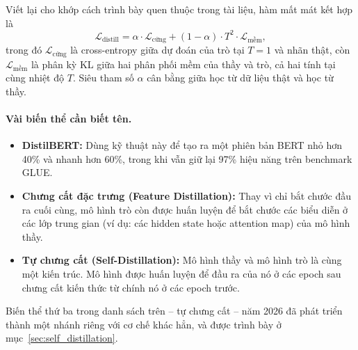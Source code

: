 Viết lại cho khớp cách trình bày quen thuộc trong tài liệu, hàm mất mát kết hợp là
\begin{equation}
	\mathcal{L}_{\text{distill}} = \alpha \cdot \mathcal{L}_{\text{cứng}} + (1-\alpha) \cdot T^2 \cdot \mathcal{L}_{\text{mềm}},
	\label{eq:distillation_loss}
\end{equation}
trong đó $\mathcal{L}_{\text{cứng}}$ là cross-entropy giữa dự đoán của trò tại $T = 1$ và nhãn thật, còn $\mathcal{L}_{\text{mềm}}$ là phân kỳ KL giữa hai phân phối mềm của thầy và trò, cả hai tính tại cùng nhiệt độ $T$. Siêu tham số $\alpha$ cân bằng giữa học từ dữ liệu thật và học từ thầy.

\begin{center}
	\label{fig:knowledge_distillation}
\end{center}

\paragraph{Vài biến thể cần biết tên.}
\begin{itemize}
	\item \textbf{DistilBERT:} Dùng kỹ thuật này để tạo ra một phiên bản BERT nhỏ hơn 40\% và nhanh hơn 60\%, trong khi vẫn giữ lại 97\% hiệu năng trên benchmark GLUE.
	\item \textbf{Chưng cất đặc trưng (Feature Distillation):} Thay vì chỉ bắt chước đầu ra cuối cùng, mô hình trò còn được huấn luyện để bắt chước các biểu diễn ở các lớp trung gian (ví dụ: các hidden state hoặc attention map) của mô hình thầy.
	\item \textbf{Tự chưng cất (Self-Distillation):} Mô hình thầy và mô hình trò là cùng một kiến trúc. Mô hình được huấn luyện để đầu ra của nó ở các epoch sau chưng cất kiến thức từ chính nó ở các epoch trước.
\end{itemize}
Biến thể thứ ba trong danh sách trên -- tự chưng cất -- năm 2026 đã phát triển thành một nhánh riêng với cơ chế khác hẳn, và được trình bày ở mục~\ref{sec:self_distillation}.

